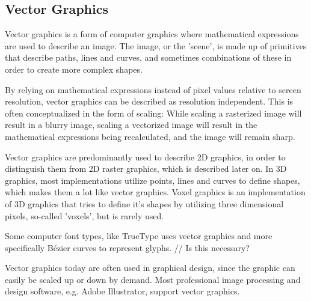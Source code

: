 \subsection{Vector Graphics}
Vector graphics is a form of computer graphics where mathematical expressions are used to describe an image. The image, or the 'scene', is made up of primitives that describe paths, lines and curves, and sometimes combinations of these in order to create more complex shapes.

By relying on mathematical expressions instead of pixel values relative to screen resolution, vector graphics can be described as resolution independent. This is often conceptualized in the form of scaling: While scaling a rasterized image will result in a blurry image, scaling a vectorized image will result in the mathematical expressions being recalculated, and the image will remain sharp.

Vector graphics are predominantly used to describe 2D graphics, in order to distinguish them from 2D raster graphics, which is described later on. In 3D graphics, most implementations utilize points, lines and curves to define shapes, which makes them a lot like vector graphics. Voxel graphics is an implementation of 3D graphics that tries to define it's shapes by utilizing three dimensional pixels, so-called 'voxels', but is rarely used.

Some computer font types, like TrueType uses vector graphics and more specifically Bézier curves to represent glyphs\cite{truetype}. // Is this necessary?

Vector graphics today are often used in graphical design, since the graphic can easily be scaled up or down by demand. Most professional image processing and design software, e.g. Adobe Illustrator, support vector graphics. 
